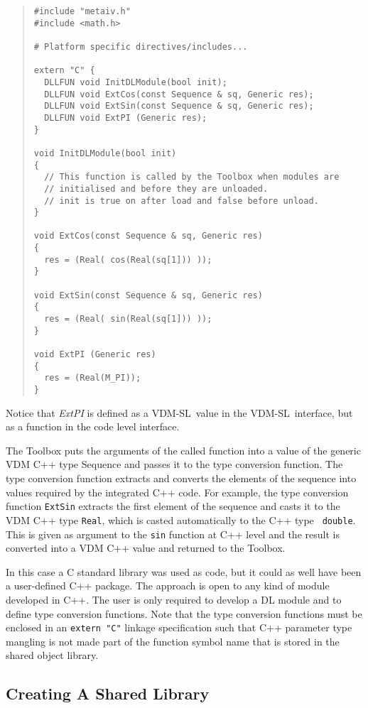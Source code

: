 \documentclass[\pformat,12pt]{article}
\newcommand{\vdmslpp}{VDM-SL}
\newcommand{\Toolbox}{Toolbox}
\begin{document}
\begin{quote}
\begin{verbatim}
#include "metaiv.h"
#include <math.h>

# Platform specific directives/includes...

extern "C" {
  DLLFUN void InitDLModule(bool init);
  DLLFUN void ExtCos(const Sequence & sq, Generic res);
  DLLFUN void ExtSin(const Sequence & sq, Generic res);
  DLLFUN void ExtPI (Generic res);
}

void InitDLModule(bool init)
{
  // This function is called by the Toolbox when modules are
  // initialised and before they are unloaded.
  // init is true on after load and false before unload. 
}

void ExtCos(const Sequence & sq, Generic res)
{
  res = (Real( cos(Real(sq[1])) ));
}

void ExtSin(const Sequence & sq, Generic res)
{
  res = (Real( sin(Real(sq[1])) ));
}

void ExtPI (Generic res)
{
  res = (Real(M_PI));
}  
\end{verbatim}
\end{quote}

Notice that {\em ExtPI\/} is defined as a \vdmslpp\ value in the
\vdmslpp\ interface, but as a function in the code level interface.

The Toolbox puts the arguments of the called function into a value of
the generic VDM C++ type Sequence and passes it to the type conversion
function. The type conversion function extracts and converts the
elements of the sequence into values required by the integrated C++
code. For example, the type conversion function {\tt ExtSin} extracts
the first element of the sequence and casts it to the VDM C++ type
{\tt Real}, which is casted automatically to the C++ type {\tt
  double}.  This is given as argument to the {\tt sin} function at C++
level and the result is converted into a VDM C++ value and returned to
the \Toolbox.

In this case a C standard library was used as code, but it could as
well have been a user-defined C++ package. The approach is open to any
kind of module developed in C++. The user is only required to develop
a DL module and to define type conversion functions. Note that the
type conversion functions must be enclosed in an {\tt extern "C"}
linkage specification such that C++ parameter type mangling is not
made part of the function symbol name that is stored in the shared
object library.

\subsection*{Creating A Shared Library}
\end{document}
